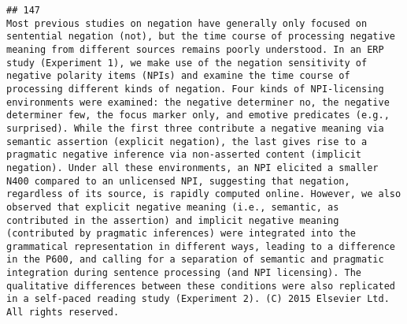 \documentclass[
  english,
  man]{apa6}
\begin{document}
\begin{verbatim}
## 147                                                                                                                                                                                                                                                                                                                                                                                                                                                                                                                                                                                                                                                                                                                                                                                                                                                                                                                                                                                                                                                                                                                                    Most previous studies on negation have generally only focused on sentential negation (not), but the time course of processing negative meaning from different sources remains poorly understood. In an ERP study (Experiment 1), we make use of the negation sensitivity of negative polarity items (NPIs) and examine the time course of processing different kinds of negation. Four kinds of NPI-licensing environments were examined: the negative determiner no, the negative determiner few, the focus marker only, and emotive predicates (e.g., surprised). While the first three contribute a negative meaning via semantic assertion (explicit negation), the last gives rise to a pragmatic negative inference via non-asserted content (implicit negation). Under all these environments, an NPI elicited a smaller N400 compared to an unlicensed NPI, suggesting that negation, regardless of its source, is rapidly computed online. However, we also observed that explicit negative meaning (i.e., semantic, as contributed in the assertion) and implicit negative meaning (contributed by pragmatic inferences) were integrated into the grammatical representation in different ways, leading to a difference in the P600, and calling for a separation of semantic and pragmatic integration during sentence processing (and NPI licensing). The qualitative differences between these conditions were also replicated in a self-paced reading study (Experiment 2). (C) 2015 Elsevier Ltd. All rights reserved.

\end{verbatim}
\end{document}
